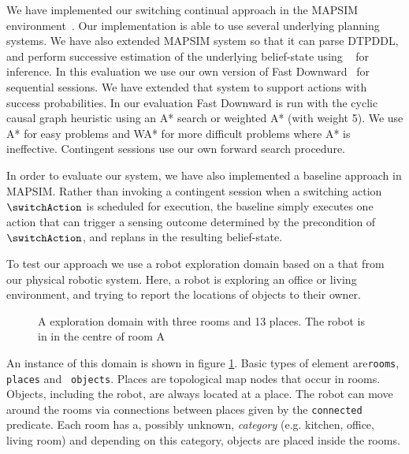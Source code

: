
We have implemented our switching continual approach in the MAPSIM
environment~\cite{brenner:nebel:jaamas09}. Our implementation is able
to use several underlying planning systems. We have also extended
MAPSIM system so that it can parse DTPDDL, and perform successive
estimation of the underlying belief-state using
~\cite{king:2009} for inference.  In this evaluation
we use our own version of Fast Downward~\cite{fast-downward} for
sequential sessions. We have extended that system to support actions
with success probabilities. In our evaluation Fast Downward is run
with the cyclic causal graph heuristic using an A* search or weighted
A* (with weight 5). We use A* for easy problems and WA* for more
difficult problems where A* is ineffective. Contingent sessions use
our own forward search procedure.



In order to evaluate our system, we have also implemented a baseline
approach in MAPSIM. Rather than invoking a contingent session when a
switching action $\switchAction$ is scheduled for execution, the
baseline simply executes one action that can trigger a sensing outcome
determined by the precondition of $\switchAction$, and replans in the
resulting belief-state.






To test our approach we use a robot exploration domain based on a that
from our physical robotic system. Here, a robot is exploring an office
or living environment, and trying to report the locations of objects
to their owner.

\begin{figure}[h]
  \centering
  
  \caption{A exploration domain with three rooms and 13 places. The
    robot is in in the centre of room A}
\label{fig:dora2}
\end{figure}
An instance of this domain is shown in figure \ref{fig:dora2}. Basic
types of element are{\tt rooms}, {\tt places} and {\tt
  objects}. Places are topological map nodes that occur in rooms.
Objects, including the robot, are always located at a place. The robot
can move around the rooms via connections between places given by the
{\tt connected} predicate. Each room has a, possibly unknown, {\em
  category} (e.g. kitchen, office, living room) and depending on this
category, objects are placed inside the rooms.

